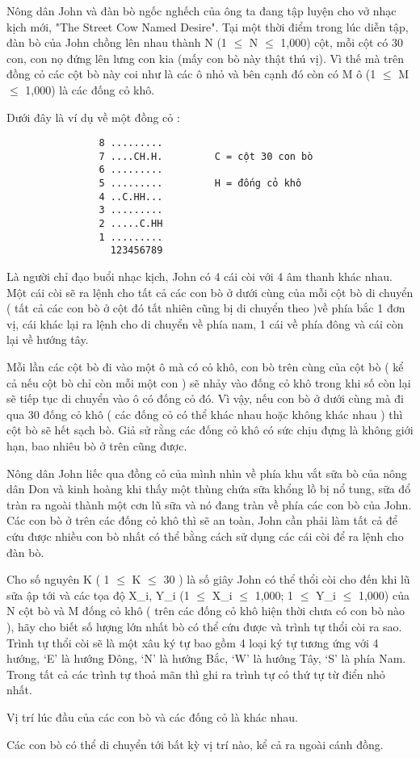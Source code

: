 Nông dân John và đàn bò ngốc nghếch của ông ta đang tập luyện cho vở  nhạc kịch mới, "The Street Cow Named Desire". Tại một thời điểm trong  lúc diễn tập, đàn bò của John chồng lên nhau thành N (1  $\le$  N  $\le$  1,000)  cột, mỗi cột có 30 con, con nọ đứng lên lưng con kia (mấy con bò này thật  thú vị). Vì thế mà trên đồng cỏ các cột bò này coi như là các ô nhỏ và  bên cạnh đó còn có M ô (1  $\le$  M  $\le$  1,000) là các đống cỏ khô.  

   Dưới đây là ví dụ về một đồng cỏ :  
\begin{verbatim}
                8 .........
                7 ....CH.H.         C = cột 30 con bò
                6 .........
                5 .........         H = đống cỏ khô
                4 ..C.HH...
                3 .........
                2 .....C.HH
                1 .........
                  123456789
\end{verbatim}

   Là người chỉ đạo buổi nhạc kịch, John có 4 cái còi với 4 âm thanh khác nhau. Một cái còi sẽ ra lệnh cho tất cả các con bò ở dưới cùng của mỗi cột bò  di chuyển ( tất cả các con bò ở cột đó tất nhiên cũng bị di chuyển theo )về phía  bắc 1 đơn vị, cái khác lại ra lệnh cho di chuyển về phía nam, 1 cái  về phía đông và cái còn lại về hướng tây.  

   Mỗi lần các cột bò đi vào một ô mà có cỏ khô, con bò trên cùng của cột  bò ( kể cả nếu cột bò chỉ còn mỗi một con ) sẽ nhảy vào đống cỏ khô trong  khi số còn lại sẽ tiếp tục di chuyển vào ô có đống cỏ đó. Vì vậy, nếu con  bò ở dưới cùng mà đi qua 30 đống cỏ khô ( các đống cỏ có thể khác nhau  hoặc không khác nhau ) thì cột bò sẽ hết sạch bò. Giả sử rằng các đống cỏ  khô có sức chịu đựng là không giới hạn, bao nhiêu bò ở trên cũng được.  

   Nông dân John liếc qua đồng cỏ của mình nhìn về phía khu vắt sữa bò  của nông dân Don và kinh hoàng khi thấy một thùng chứa sữa khổng lồ  bị nổ tung, sữa đổ tràn ra ngoài thành một cơn lũ sữa và nó đang  tràn về phía các con bò của John. Các con bò ở trên các đống cỏ khô  thì sẽ an toàn, John cần phải làm tất cả để cứu được nhiều con bò nhất  có thể bằng cách sử dụng các cái còi để ra lệnh cho đàn bò.  

   Cho số nguyên K ( 1  $\le$  K  $\le$  30 ) là số giây John có thể thổi còi cho  đến khi lũ sữa ập tới và các tọa độ X\_i, Y\_i (1  $\le$  X\_i  $\le$  1,000;  1  $\le$  Y\_i  $\le$  1,000) của N cột bò và M đống cỏ khô ( trên các đống  cỏ khô hiện thời chưa có con bò nào ), hãy cho biết số lượng lớn nhất bò  có thể cứu được và trình tự thổi còi ra sao. Trình tự thổi còi sẽ  là một xâu ký tự bao gồm 4 loại ký tự tương ứng với 4 hướng, ‘E’ là  hướng Đông, ‘N’ là hướng Bắc, ‘W’ là hướng Tây, ‘S’ là phía Nam.  Trong tất cả các trình tự thoả mãn thì ghi ra trình tự có thứ tự từ điển nhỏ nhất.  

   Vị trí lúc đầu của các con bò và các đống cỏ là khác nhau.  

   Các con bò có thể di chuyển tới bất kỳ vị trí nào, kể cả ra ngoài cánh đồng.